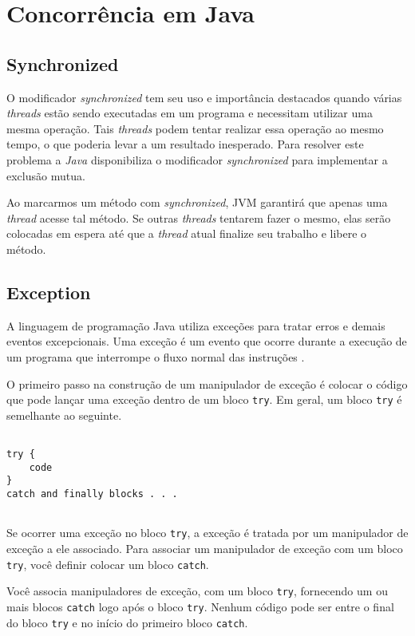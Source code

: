 \chapter{Concorrência em Java}
\label{cha:concjava}

\section{Synchronized}

O modificador \textit{synchronized} tem seu uso e importância destacados quando
várias \textit{threads} estão sendo executadas em um programa e necessitam
utilizar uma mesma operação. Tais \textit{threads} podem tentar realizar
essa operação ao mesmo tempo, o que poderia levar a um resultado
inesperado. Para resolver este problema a \textit{Java} disponibiliza o
modificador \textit{synchronized} para implementar a exclusão mutua.

Ao marcarmos um método com \textit{synchronized}, JVM 
garantirá que apenas uma \textit{thread} acesse tal método. Se outras %
\textit{threads} tentarem fazer o mesmo, elas serão colocadas em espera até que a
\textit{thread} atual finalize seu trabalho e libere o método.

\section{Exception}

A linguagem de programação Java utiliza exceções para tratar erros e
demais eventos excepcionais. Uma exceção é um evento que ocorre durante
a execução de um programa que interrompe o fluxo normal das instruções
\cite{except}.

O primeiro passo na construção de um manipulador de exceção é colocar
o código que pode lançar uma exceção dentro de um bloco \texttt{try}. Em geral,
um bloco \texttt{try} é semelhante ao seguinte.

\begin{lstlisting}

try {
    code
}
catch and finally blocks . . .
    
\end{lstlisting}


Se ocorrer uma exceção no bloco \texttt{try}, a exceção é tratada por um
manipulador de exceção a ele associado. Para associar um manipulador de
exceção com um bloco \texttt{try}, você definir colocar um bloco
\texttt{catch}.

Você associa manipuladores de exceção, com um bloco \texttt{try}, fornecendo
um ou mais blocos \texttt{catch} logo após o bloco \texttt{try}. Nenhum
código pode ser entre o final do bloco \texttt{try} e no início do primeiro bloco %
\texttt{catch}.

